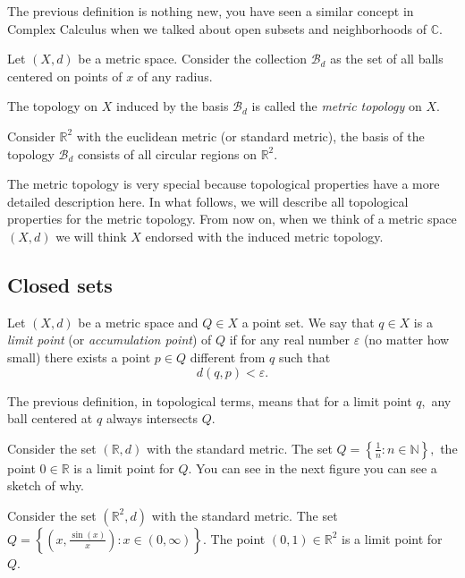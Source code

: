 \documentclass[
	fontsize=10pt, %
	twoside=false, %
	secnumdepth=1, %
]{kaobook}
\begin{document}
The previous definition is nothing new, you have seen a similar concept in Complex Calculus when we talked about open subsets and neighborhoods of $\mathbb{C}.$

\begin{definition}
Let $(X,d)$ be a metric space. Consider the collection $\mathcal{B}_d$ as the set of all balls centered on points of $x$ of any radius. 

The topology on $X$ induced by the basis $\mathcal{B}_d$ is called the \emph{metric topology} on $X.$
\end{definition}

\begin{example}
Consider $\mathbb{R}^2$ with the euclidean metric (or standard metric), the basis of the topology $\mathcal{B}_d$ consists of all circular regions on $\mathbb{R}^2.$
\end{example}

The metric topology is very special because topological properties have a more detailed description here. In what follows, we will describe all topological properties for the metric topology. From now on, when we think of a metric space $(X,d)$ we will think $X$ endorsed with the induced metric topology.

\subsection{Closed sets}

\begin{definition}
Let $(X,d)$ be a metric space and $Q\in X$ a point set. We say that $q\in X$ is a \emph{limit point} (or \emph{accumulation point}) of $Q$ if for any real number $\varepsilon$ (no matter how small) there exists a point $p\in Q$ different from $q$ such that $$d(q,p)<\varepsilon.$$
\end{definition}

The previous definition, in topological terms, means that for a limit point $q,$ any ball centered at $q$ always intersects $Q$.

\begin{example}
Consider the set $(\mathbb{R},d)$ with the standard metric. The set $Q=\left\{\frac{1}{n}: n\in\mathbb{N}\right\},$ the point $0\in\mathbb{R}$ is a limit point for $Q.$ You can see in the next figure you can see a sketch of why.
\end{example}

\begin{example}
Consider the set $(\mathbb{R}^2,d)$ with the standard metric. The set $Q=\left\{\left(x,\frac{\sin(x)}{x}\right): x\in(0,\infty)\right\}.$ The point $(0,1)\in \mathbb{R}^2$ is a limit point for $Q.$
\end{example}
\end{document}
